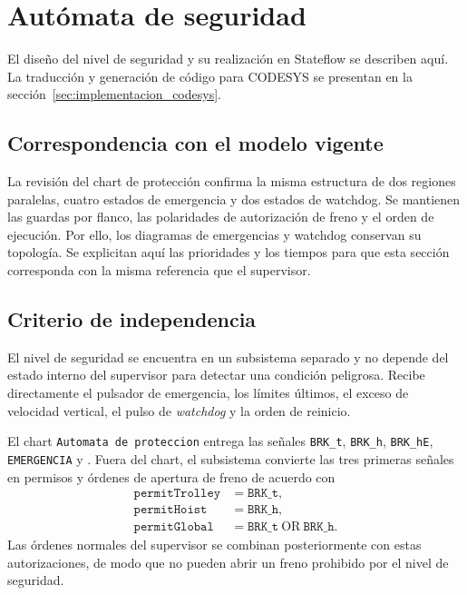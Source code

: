 \documentclass[a4paper,10pt,onecolumn,journal]{ieeeconf}
\numberwithin{equation}{section}
\begin{document}

\par
{}
\section{Autómata de seguridad}
\label{sec:seguridad_MIL}
El diseño del nivel de seguridad y su realización en Stateflow se describen aquí. La traducción y generación de código para CODESYS se presentan en la sección~\ref{sec:implementacion_codesys}.


\subsection{Correspondencia con el modelo vigente}
La revisión del chart de protección confirma la misma estructura de dos regiones paralelas, cuatro estados de emergencia y dos estados de watchdog. Se mantienen las guardas por flanco, las polaridades de autorización de freno y el orden de ejecución. Por ello, los diagramas de emergencias y watchdog conservan su topología. Se explicitan aquí las prioridades y los tiempos para que esta sección corresponda con la misma referencia que el supervisor.


\subsection{Criterio de independencia}
El nivel de seguridad se encuentra en un subsistema separado y no depende del estado interno del supervisor para detectar una condición peligrosa. Recibe directamente el pulsador de emergencia, los límites últimos, el exceso de velocidad vertical, el pulso de \textit{watchdog} y la orden de reinicio.

El chart \texttt{Automata de proteccion} entrega las señales \texttt{BRK\_t}, \texttt{BRK\_h}, \texttt{BRK\_hE}, \texttt{EMERGENCIA} y . Fuera del chart, el subsistema convierte las tres primeras señales en permisos y órdenes de apertura de freno de acuerdo con
\begin{align}
\texttt{permitTrolley}&=\texttt{BRK\_t},\\
\texttt{permitHoist}&=\texttt{BRK\_h},\\
\texttt{permitGlobal}&=\texttt{BRK\_t}\ \mathrm{OR}\ \texttt{BRK\_h}.
\end{align}
Las órdenes normales del supervisor se combinan posteriormente con estas autorizaciones, de modo que no pueden abrir un freno prohibido por el nivel de seguridad.
\end{document}
